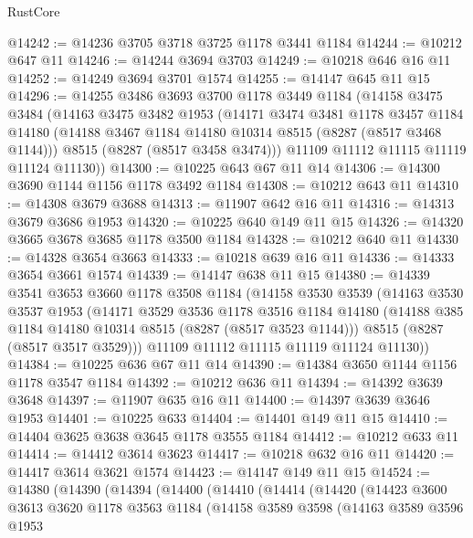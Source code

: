 \begin{lexlean}{RustCore}
\begin{coremodule}
@14242 := @14236 @3705 @3718 @3725 @1178 @3441 @1184
@14244 := @10212 @647 @11
@14246 := @14244 @3694 @3703
@14249 := @10218 @646 @16 @11
@14252 := @14249 @3694 @3701 @1574
@14255 := @14147 @645 @11 @15
@14296 := @14255
    @3486
    @3693
    @3700
    @1178
    @3449
    @1184
    (@14158
      @3475
      @3484
      (@14163
        @3475
        @3482
        @1953
        (@14171
          @3474
          @3481
          @1178
          @3457
          @1184
          @14180
          (@14188 @3467 @1184 @14180 @10314 @8515 (@8287 (@8517 @3468 @1144)))
          @8515
          (@8287 (@8517 @3458 @3474)))
        @11109
        @11112
        @11115
        @11119
        @11124
        @11130))
@14300 := @10225 @643 @67 @11 @14
@14306 := @14300 @3690 @1144 @1156 @1178 @3492 @1184
@14308 := @10212 @643 @11
@14310 := @14308 @3679 @3688
@14313 := @11907 @642 @16 @11
@14316 := @14313 @3679 @3686 @1953
@14320 := @10225 @640 @149 @11 @15
@14326 := @14320 @3665 @3678 @3685 @1178 @3500 @1184
@14328 := @10212 @640 @11
@14330 := @14328 @3654 @3663
@14333 := @10218 @639 @16 @11
@14336 := @14333 @3654 @3661 @1574
@14339 := @14147 @638 @11 @15
@14380 := @14339
    @3541
    @3653
    @3660
    @1178
    @3508
    @1184
    (@14158
      @3530
      @3539
      (@14163
        @3530
        @3537
        @1953
        (@14171
          @3529
          @3536
          @1178
          @3516
          @1184
          @14180
          (@14188 @385 @1184 @14180 @10314 @8515 (@8287 (@8517 @3523 @1144)))
          @8515
          (@8287 (@8517 @3517 @3529)))
        @11109
        @11112
        @11115
        @11119
        @11124
        @11130))
@14384 := @10225 @636 @67 @11 @14
@14390 := @14384 @3650 @1144 @1156 @1178 @3547 @1184
@14392 := @10212 @636 @11
@14394 := @14392 @3639 @3648
@14397 := @11907 @635 @16 @11
@14400 := @14397 @3639 @3646 @1953
@14401 := @10225 @633
@14404 := @14401 @149 @11 @15
@14410 := @14404 @3625 @3638 @3645 @1178 @3555 @1184
@14412 := @10212 @633 @11
@14414 := @14412 @3614 @3623
@14417 := @10218 @632 @16 @11
@14420 := @14417 @3614 @3621 @1574
@14423 := @14147 @149 @11 @15
@14524 := @14380
    (@14390
      (@14394
        (@14400
          (@14410
            (@14414
              (@14420
                (@14423
                  @3600
                  @3613
                  @3620
                  @1178
                  @3563
                  @1184
                  (@14158
                    @3589
                    @3598
                    (@14163
                      @3589
                      @3596
                      @1953

\end{coremodule}
\end{lexlean}
